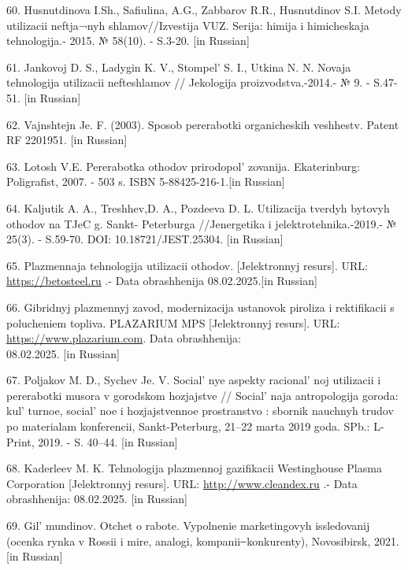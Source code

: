 \begin{references}
60. Husnutdinova I.Sh., Safiulina, A.G., Zabbarov R.R., Husnutdinov S.I.
Metody utilizacii neftja¬nyh shlamov//Izvestija VUZ. Serija: himija i
himicheskaja tehnologija.- 2015. № 58(10). - S.3-20. {[}in Russian{]}

61. Jankovoj D. S., Ladygin K. V., Stompel'{} S. I.,
Utkina N. N. Novaja tehnologija utilizacii nefteshlamov // Jekologija
proizvodstva.-2014.- № 9. - S.47-51. {[}in Russian{]}

62. Vajnshtejn Je. F. (2003). Sposob pererabotki organicheskih
veshhestv. Patent RF 2201951. {[}in Russian{]}

63. Lotosh V.E. Pererabotka othodov prirodopol' zovanija.
Ekaterinburg: Poligrafist, 2007. - 503 s. ISBN 5-88425-216-1.{[}in
Russian{]}

64. Kaljutik A. A., Treshhev,D. A., Pozdeeva D. L. Utilizacija tverdyh
bytovyh othodov na TJeC g. Sankt- Peterburga //Jenergetika i
jelektrotehnika.-2019.- № 25(3). - S.59-70. DOI: 10.18721/JEST.25304.
{[}in Russian{]}

65. Plazmennaja tehnologija utilizacii othodov. {[}Jelektronnyj
resurs{]}. URL:
\href{https://betosteel.ru/articles/plazmennaya-texnologiya-utilizacii-otxodov.html}{https://betosteel.ru} .-
Data obrashhenija 08.02.2025.{[}in Russian{]}

66. Gibridnyj plazmennyj zavod, modernizacija ustanovok piroliza i
rektifikacii s polucheniem topliva. PLAZARIUM MPS {[}Jelektronnyj
resurs{]}. URL:
\href{https://www.plazarium.com/ru/products/plasma-pyrolysis-units/plazarium-mps/}{https://www.plazarium.com}.
Data obrashhenija: \\08.02.2025. {[}in Russian{]}

67. Poljakov M. D., Sychev Je. V. Social' nye aspekty
racional' noj utilizacii i pererabotki musora v gorodskom
hozjajstve // Social' naja antropologija goroda:
kul' turnoe, social' noe i hozjajstvennoe
prostra\-nstvo : sbornik nauchnyh trudov po materialam konferencii,
Sankt-Peterburg, 21--22 marta 2019 goda. SPb.: L-Print, 2019. - S.
40--44. {[}in Russian{]}

68. Kaderleev M. K. Tehnologija plazmennoj gazifikacii Westinghouse
Plasma Corporation {[}Jelektronnyj resurs{]}. URL:
\href{http://www.cleandex.ru/articles/2016/03/07/zavody_po_pererabotke_othodov_proizvodstva_i_potrebleniya_v_elektroenergiyu}{http://www.cleandex.ru} .- Data
obrashhenija: 08.02.2025. {[}in Russian{]}

69. Gil' mundinov. Otchet o rabote. Vypolnenie
marketingovyh issledovanij (ocenka rynka v Rossii i mire, analogi,
kompanii ̶ konkurenty), Novosibirsk, 2021. {[}in Russian{]}
\end{references}

